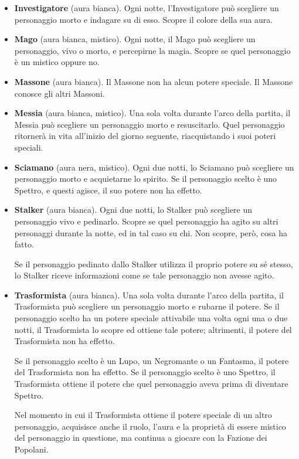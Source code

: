 \documentclass[a4paper,10pt]{article}
\begin{document}
\begin{itemize}
 \item {\bf Investigatore} (aura bianca). Ogni notte, l'Investigatore può
scegliere un personaggio morto e indagare su di esso. Scopre il colore della sua
aura.

 \item {\bf Mago} (aura bianca, mistico). Ogni notte, il Mago può scegliere un
personaggio, vivo o morto, e percepirne la magia. Scopre se quel personaggio è
un mistico oppure no.
 
 \item {\bf Massone} (aura bianca). Il Massone non ha alcun potere speciale. Il
Massone conosce gli altri Massoni.
 
 \item {\bf Messia} (aura bianca, mistico). Una sola volta durante l'arco della
partita, il Messia può scegliere un personaggio morto e resuscitarlo. Quel
personaggio ritornerà in vita all'inizio del giorno seguente, riacquistando i
suoi poteri speciali.

 \item{\bf Sciamano} (aura nera, mistico). Ogni due notti, lo Sciamano
può scegliere un personaggio morto e acquietarne lo spirito.
Se il personaggio scelto è uno Spettro, e questi agisce, il suo potere non ha effetto.

 \item {\bf Stalker} (aura bianca). Ogni due notti, lo Stalker può scegliere un
personaggio vivo e pedinarlo. Scopre se quel personaggio ha agito su altri
personaggi durante la notte, ed in tal caso su chi. Non scopre, però, cosa ha
fatto.
 
 Se il personaggio pedinato dallo Stalker utilizza il proprio potere su sé
stesso, lo Stalker riceve informazioni come se tale personaggio non avesse
agito.

 \item {\bf Trasformista} (aura bianca). Una sola volta durante l'arco della
partita, il Trasformista può scegliere un personaggio morto e rubarne il potere. 
 Se il personaggio scelto ha un potere speciale attivabile una volta ogni una o
due notti, il Trasformista lo scopre ed ottiene tale potere; altrimenti, il potere
del Trasformista non ha effetto.
 
 Se il personaggio scelto è un Lupo, un Negromante o un Fantasma, il potere del
Trasformista non ha effetto.
 Se il personaggio scelto è uno Spettro, il Trasformista ottiene il potere che quel
personaggio aveva prima di diventare Spettro.
 
 Nel momento in cui il Trasformista ottiene il potere speciale di un altro
personaggio, acquisisce anche il ruolo, l'aura e la proprietà di essere mistico
del personaggio in questione, ma continua a giocare con la Fazione dei Popolani.


\end{itemize}
\end{document}
